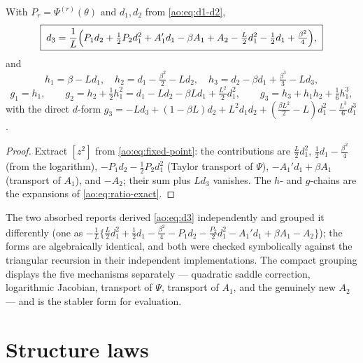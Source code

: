 \begin{theorem}
\label{ao:thm:third-order}
With $P_r=\Psi^{(r)}(\theta)$ and $d_1,d_2$ from
\eqref{ao:eq:d1-d2},
\begin{equation}
 \boxed{\;
 d_3=\frac1L\Bigl(
 P_1d_2+\tfrac12P_2d_1^{2}+A_1'd_1-\beta A_1+A_2
 -\tfrac L2d_1^{2}-\tfrac12d_1+\tfrac{\beta^{2}}4
 \Bigr),
 \;}
 \label{ao:eq:d3}
\end{equation}
and
\begin{equation}
 h_1=\beta-Ld_1,\quad
 h_2=d_1-\tfrac{\beta^{2}}2-Ld_2,\quad
 h_3=d_2-\beta d_1+\tfrac{\beta^{3}}3-Ld_3,
 \label{ao:eq:h123}
\end{equation}
\begin{equation}
 g_1=h_1,\qquad
 g_2=h_2+\tfrac12h_1^{2}
 =d_1-Ld_2-\beta Ld_1+\tfrac{L^{2}}2d_1^{2},
 \qquad
 g_3=h_3+h_1h_2+\tfrac16h_1^{3},
 \label{ao:eq:g123}
\end{equation}
with the direct $d$-form
$g_3=-Ld_3+(1-\beta L)d_2+L^{2}d_1d_2
+(\tfrac{\beta L^{2}}2-L)d_1^{2}-\tfrac{L^{3}}6d_1^{3}$.
\end{theorem}

\begin{proof}
Extract $[z^{2}]$ from \eqref{ao:eq:fixed-point}: the contributions are
$\tfrac L2d_1^{2}$, $\tfrac12d_1-\tfrac{\beta^{2}}4$ (from the
logarithm), $-P_1d_2-\tfrac12P_2d_1^{2}$ (Taylor transport of
$\Psi$), $-A_1'd_1+\beta A_1$ (transport of $A_1$), and $-A_2$; their
sum plus $Ld_3$ vanishes.  The $h$- and $g$-chains are the expansions
of \eqref{ao:eq:ratio-exact}.
\end{proof}

\begin{remark}
The two absorbed reports derived \eqref{ao:eq:d3} independently and
grouped it differently (one as
$-\tfrac1L\{\tfrac L2d_1^{2}+\tfrac12d_1-\tfrac{\beta^{2}}4
-P_1d_2-\tfrac{P_2}2d_1^{2}-A_1'd_1+\beta A_1-A_2\}$); the forms are
algebraically identical, and both were checked symbolically against
the triangular recursion in their independent implementations.  The
compact grouping displays the five mechanisms separately ---
quadratic saddle correction, logarithmic Jacobian, transport of
$\Psi$, transport of $A_1$, and the genuinely new $A_2$ --- and is
the stabler form for evaluation.
\end{remark}

\section{Structure laws}
\label{ao:sec:structure}

